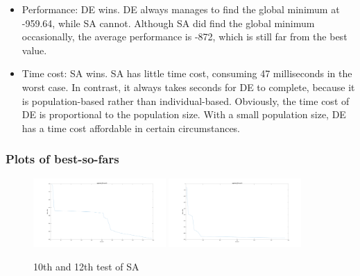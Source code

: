 \documentclass{IEEEtran}
\begin{document}
{{{            \begin{itemize}
                \item Performance: DE wins. DE always manages to find the global minimum at -959.64, while SA cannot. 
                Although SA did find the global minimum occasionally, the average performance is -872, which is still far from the best value.
                \item Time cost: SA wins. SA has little time cost, consuming 47 milliseconds in the worst case. 
                In contrast, it always takes seconds for DE to complete, because it is population-based rather than individual-based. 
                Obviously, the time cost of DE is proportional to the population size. 
                With a small population size, DE has a time cost affordable in certain circumstances.
            \end{itemize}
        }

        \subsubsection{Plots of best-so-fars}
        {
            \begin{figure}[!htbp]
                \centering
                \includegraphics[width=0.45\textwidth]{Q1/figures/eggholder_SA_test_10.png}
                \includegraphics[width=0.45\textwidth]{Q1/figures/eggholder_SA_test_12.png}
                \caption{10th and 12th test of SA}
                \label{fig:plots_SA}
            \end{figure}

}}}
\end{document}
